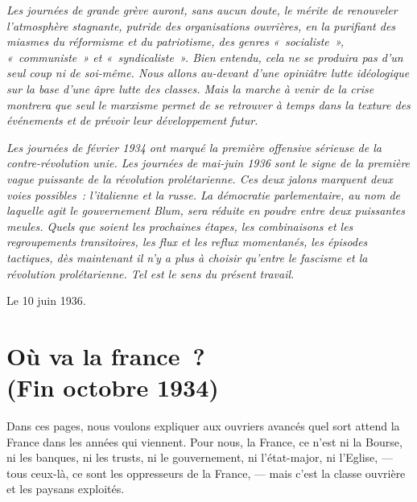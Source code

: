 \documentclass[french,twoside]{book} %
\newcommand{\byline}[1]{\bigskip{\RaggedLeft{#1}\par}\bigskip}
\begin{document}
 \emph{Les journées de grande grève auront, sans aucun doute, le mérite de renouveler l’atmosphère stagnante, putride des organisations ouvrières, en la purifiant des miasmes du réformisme et du  patriotisme, des genres « socialiste », « communiste » et « syndicaliste ». Bien entendu, cela ne se produira pas d’un seul coup ni de soi-même. Nous allons au-devant d’une opiniâtre lutte idéologique sur la base d’une âpre lutte des classes. Mais la marche à venir de la crise montrera que seul le marxisme permet de se retrouver à temps dans la texture des événements et de prévoir leur développement futur.} \par
 \emph{Les journées de février 1934 ont marqué la première offensive sérieuse de la contre-révolution unie. Les journées de mai-juin 1936 sont le signe de la première vague puissante de la révolution prolétarienne. Ces deux jalons marquent deux voies possibles : l’italienne et la russe. La démocratie parlementaire, au nom de laquelle agit le gouvernement Blum, sera réduite en poudre entre deux puissantes meules. Quels que soient les prochaines étapes, les combinaisons et les regroupements transitoires, les flux et les reflux momentanés, les épisodes tactiques, dès maintenant il n’y a plus à choisir qu’entre le fascisme et la révolution prolétarienne. Tel est le sens du présent travail.} \par
Le 10 juin 1936.\par

\byline{L. T{\scshape rotsky}.}
  \section[{Où va la france ? (Fin octobre 1934)}]{Où va la france ? \\
(Fin octobre 1934)}
\label{p2}\renewcommand{\leftmark}{Où va la france ? \\
(Fin octobre 1934)}

\noindent Dans ces pages, nous voulons expliquer aux ouvriers avancés quel sort attend la France dans les années qui viennent. Pour nous, la France, ce n’est ni la Bourse, ni les banques, ni les trusts, ni le gouvernement, ni l’état-major, ni l’Eglise, — tous ceux-là, ce sont les oppresseurs de la France, — mais c’est la classe ouvrière et les paysans exploités.\par
\end{document}

